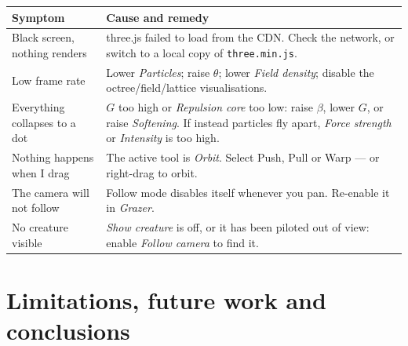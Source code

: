 \documentclass[10pt,a4paper]{article}
\newcommand{\code}[1]{\texttt{\small #1}}
\begin{document}
\begin{center}
\small
\begin{tabular}{@{}p{4.4cm}p{11.6cm}@{}}
\toprule
\textbf{Symptom} & \textbf{Cause and remedy}\\
\midrule
Black screen, nothing renders & three.js failed to load from the CDN. Check the network, or switch to a local copy of \code{three.min.js}.\\
Low frame rate & Lower \emph{Particles}; raise $\theta$; lower \emph{Field density}; disable the octree/field/lattice visualisations.\\
Everything collapses to a dot & $G$ too high or \emph{Repulsion core} too low: raise $\beta$, lower $G$, or raise \emph{Softening}. If instead particles fly apart, \emph{Force strength} or \emph{Intensity} is too high.\\
Nothing happens when I drag & The active tool is \emph{Orbit}. Select Push, Pull or Warp --- or right-drag to orbit.\\
The camera will not follow & Follow mode disables itself whenever you pan. Re-enable it in \emph{Grazer}.\\
No creature visible & \emph{Show creature} is off, or it has been piloted out of view: enable \emph{Follow camera} to find it.\\
\bottomrule
\end{tabular}
\end{center}

\section{Limitations, future work and conclusions}
\label{sec:limitations}
\end{document}
